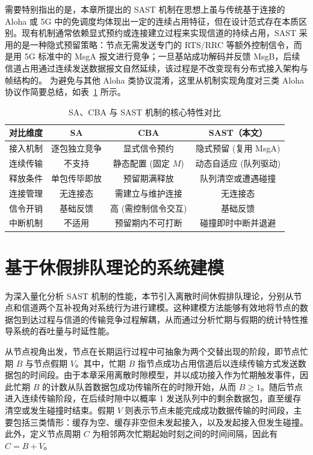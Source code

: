 需要特别指出的是，本章所提出的 SAST 机制在思想上虽与传统基于连接的 Aloha 或 5G 中的免调度均体现出一定的连续占用特征，但在设计范式存在本质区别。现有机制通常依赖显式预约或连接建立过程来实现信道的持续占用，SAST 采用的是一种隐式预留策略：节点无需发送专门的 RTS/RRC 等额外控制信令，而是用 5G 标准中的 MsgA 报文进行竞争；一旦基站成功解码并反馈 MsgB，后续信道占用通过连续发送数据报文自然延续，该过程是不改变现有分布式接入架构与帧结构的。
为避免与其他 Aloha 类协议混淆，这里从机制实现角度对三类 Aloha 协议作简要总结，如表~\ref{tab:aloha_compare} 所示。

\begin{table}[htbp]
\centering
\caption{SA、CBA 与 SAST 机制的核心特性对比}
\label{tab:aloha_compare}
\renewcommand{\arraystretch}{1.3} 
\begin{tabular}{l c c c}
\toprule
\textbf{对比维度} & \textbf{SA} & \textbf{CBA} & \textbf{SAST（本文）} \\
\midrule
接入机制 & 逐包独立竞争 & 显式信令预约 & 隐式预留 (复用 MsgA) \\
连续传输 & 不支持 & 静态配置 (固定 $M$) & 动态自适应 (队列驱动) \\
释放条件 & 单包传毕即放 & 预留期满释放 & 队列清空或遭遇碰撞 \\
连接管理 & 无连接态 & 需建立与维护连接 & 无连接态 \\
信令开销 & 基础反馈 & 高 (需控制信令交互) & 基础反馈 \\
中断机制 & 不适用 & 预留期内不可打断 & 碰撞即时中断并退避 \\
\bottomrule
\end{tabular}
\end{table}

\section{基于休假排队理论的系统建模}
\label{sec:sast_queuing_model}

为深入量化分析 SAST 机制的性能，本节引入离散时间休假排队理论\cite{2021_Huang}，分别从节点和信道两个互补视角对系统行为进行建模。这种建模方法能够有效地将节点的数据包到达过程与信道的传输竞争过程解耦，从而通过分析忙期与假期的统计特性推导系统的吞吐量与时延性能。

\label{subsec:node_perspective}

从节点视角出发，节点在长期运行过程中可抽象为两个交替出现的阶段，即节点忙期 $B$ 与节点假期 $V$。其中，忙期 $B$ 指节点成功占用信道后以连续传输方式发送数据包的时间段。由于本章采用离散时隙模型，并以成功接入作为忙期触发事件，因此忙期 $B$ 的计数从队首数据包成功传输所在的时隙开始，从而 $B\ge 1$。随后节点进入连续传输阶段，在后续时隙中以概率 1 发送队列中的剩余数据包，直至缓存清空或发生碰撞时结束。假期 $V$ 则表示节点未能完成成功数据传输的时间段，主要包括三类情形：缓存为空、缓存非空但未发起接入，以及发起接入但发生碰撞。此外，定义节点周期 $C$ 为相邻两次忙期起始时刻之间的时间间隔，因此有 $C = B + V$。

